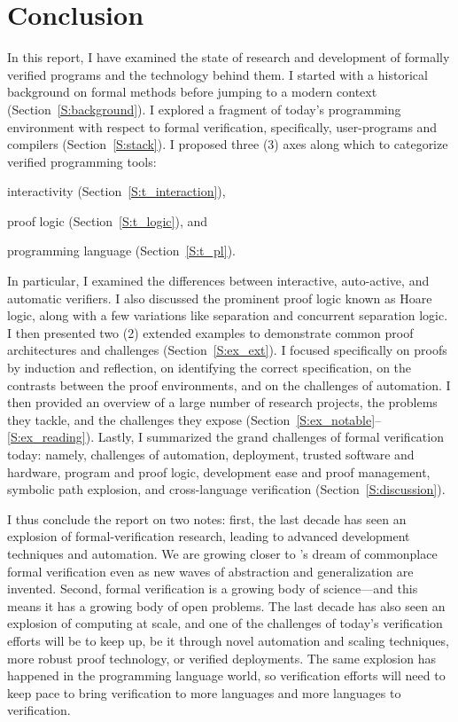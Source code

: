 \section{Conclusion}\label{S:conclusion}

In this report, I have examined the state of research and development of
formally verified programs and the technology behind them. I started with a
historical background on formal methods before jumping to a modern context
(Section~\ref{S:background}). I explored a fragment of today's programming
environment with respect to formal verification, specifically, user-programs and
compilers (Section~\ref{S:stack}). I proposed three (3) axes along which to
categorize verified programming tools:
\begin{inlist}
\item interactivity (Section~\ref{S:t_interaction}),
\item proof logic (Section~\ref{S:t_logic}), and
\item programming language (Section~\ref{S:t_pl}).
\end{inlist}
In particular, I examined the differences between interactive, auto-active, and
automatic verifiers. I also discussed the prominent proof logic known as Hoare
logic, along with a few variations like separation and concurrent separation
logic. I then presented two (2) extended examples to demonstrate common proof
architectures and challenges (Section~\ref{S:ex_ext}). I focused specifically on
proofs by induction and reflection, on identifying the correct specification, on
the contrasts between the proof environments, and on the challenges of
automation. I then provided an overview of a large number of research projects,
the problems they tackle, and the challenges they expose
(Section~\ref{S:ex_notable}--\ref{S:ex_reading}). Lastly, I summarized the grand
challenges of formal verification today: namely, challenges of automation,
deployment, trusted software and hardware, program and proof logic, development
ease and proof management, symbolic path explosion, and cross-language
verification (Section~\ref{S:discussion}).

I thus conclude the report on two notes: first, the last decade has seen an
explosion of formal-verification research, leading to advanced development
techniques and automation. We are growing closer to \citeauthor{EWD:EWD1036}'s
dream of commonplace formal verification even as new waves of abstraction and
generalization are invented. Second, formal verification is a growing body of
science---and this means it has a growing body of open problems. The last decade
has also seen an explosion of computing at scale, and one of the challenges of
today's verification efforts will be to keep up, be it through novel automation
and scaling techniques, more robust proof technology, or verified deployments.
The same explosion has happened in the programming language world, so
verification efforts will need to keep pace to bring verification to more
languages and more languages to verification.

